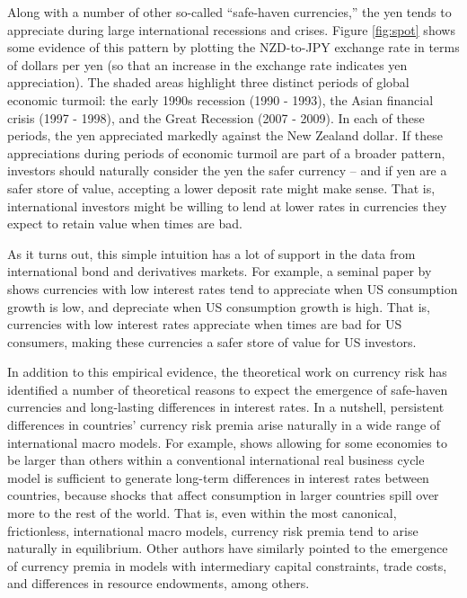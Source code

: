 \documentclass[11pt]{article}
\begin{document}
Along with a number of other so-called ``safe-haven currencies,'' the yen tends to appreciate during large international recessions and crises. Figure \ref{fig:spot} shows some evidence of this pattern by plotting the NZD-to-JPY exchange rate in terms of dollars per yen (so that an increase in the exchange rate indicates yen appreciation). The shaded areas highlight three distinct periods of global economic turmoil: the early 1990s recession (1990 - 1993), the Asian financial crisis (1997 - 1998), and the Great Recession (2007 - 2009). In each of these periods, the yen appreciated markedly against the New Zealand dollar. If these appreciations during periods of economic turmoil are part of a broader pattern, investors should naturally consider the yen the safer currency -- and if yen are a safer store of value, accepting a lower deposit rate might make sense. That is, international investors might be willing to lend at lower rates in currencies they expect to retain value when times are bad.

As it turns out, this simple intuition has a lot of support in the data from international bond and derivatives markets. For example, a seminal paper by \citet{LustigVerdelhan2007} shows currencies with low interest rates tend to appreciate when US consumption growth is low, and depreciate when US consumption growth is high. That is, currencies with low interest rates appreciate when times are bad for US consumers, making these currencies a safer store of value for US investors.

In addition to this empirical evidence, the theoretical work on currency risk has identified a number of theoretical reasons to expect the emergence of safe-haven currencies and long-lasting differences in interest rates. In a nutshell, persistent differences in countries' currency risk premia arise naturally in a wide range of international macro models. For example, \citet{Hassan2013} shows allowing for some economies to be larger than others within a conventional international real business cycle model is sufficient to generate long-term differences in interest rates between countries, because shocks that affect consumption in larger countries spill over more to the rest of the world. That is, even within the most canonical, frictionless, international macro models, currency risk premia tend to arise naturally in equilibrium. Other authors have similarly pointed to the emergence of currency premia in models with intermediary capital constraints, trade costs, and differences in resource endowments, among others.
\end{document}
